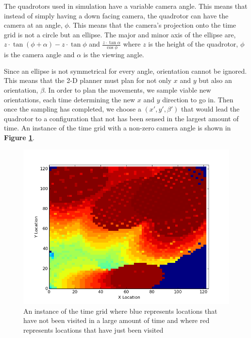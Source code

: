 \documentclass[12pt]{article}
\newcommand{\fig}[1]{\textbf{Figure \ref{fig:#1}}}
\begin{document}
The quadrotors used in simulation have a variable camera angle. This means that
instead of simply having a down facing camera, the quadrotor can have the
camera at an angle, $\phi$. This means that the camera's projection onto the
time grid is not a circle but an ellipse. The major and minor axis of the
ellipse are, $ z \cdot \tan{(\phi + \alpha)} - z \cdot \tan{\phi} $ and $
\frac{z \cdot \tan{\alpha}}{\cos{\phi}} $ where $z$ is the height of the
quadrotor, $\phi$ is the camera angle and $\alpha$ is the viewing angle.

Since an ellipse is not symmetrical for every angle, orientation cannot be
ignored.  This means that the 2-D planner must plan for not only $x$ and $y$
but also an orientation, $\beta$. In order to plan the movements, we sample
viable new orientations, each time determining the new $x$ and $y$ direction to
go in.  Then once the sampling has completed, we choose a $(x', y',
\beta')$ that would lead the quadrotor to a configuration that not has been
sensed in the largest amount of time. An instance of the time grid with a
non-zero camera angle is shown in \fig{timegrid}.

\begin{figure}[ht]

    \begin{center}

        \includegraphics[width=\linewidth]{figs/timegrid_map.png}

    \end{center}

    \caption{An instance of the time grid where blue represents locations that
        have not been visited in a large amount of time and where red
    represents locations that have just been visited}
    
    \label{fig:timegrid}

\end{figure} 
\end{document}
